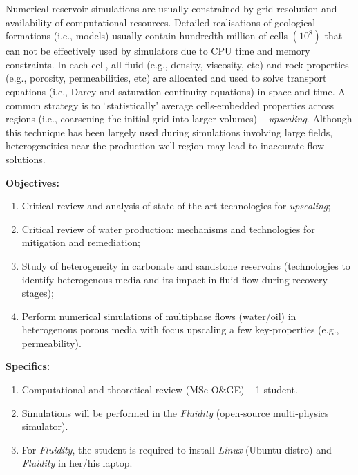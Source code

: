 \documentclass[12pts,a4paper,amsmath,amssymb,floatfix]{article}%
\newcommand{\MSc}{MSc O$\&$GE}
\begin{document}
\begin{enumerate}[label=\bfseries Project: \arabic*:]
Numerical reservoir simulations are usually constrained by grid resolution and availability of computational resources. Detailed realisations of geological formations (i.e., models) usually contain hundredth million of cells $\left(\text{10}^{8}\right)$ that can not be effectively used by simulators due to CPU time and memory constraints.  In each cell, all fluid (e.g., density, viscosity, etc) and rock properties (e.g., porosity, permeabilities, etc) are allocated and used to solve transport equations (i.e., Darcy and saturation continuity equations) in space and time. A common strategy is to $\lq$statistically' average cells-embedded properties across regions (i.e., coarsening the initial grid into larger volumes) -- {\it upscaling}.  Although this technique has been largely used during simulations involving large fields, heterogeneities near the production well region may lead to inaccurate flow solutions. 


\noindent
{\bf Objectives:}
\begin{enumerate}
\item Critical review and analysis of state-of-the-art technologies for {\it upscaling};
\item Critical review of water production: mechanisms and technologies for mitigation and remediation;
\item Study of heterogeneity in carbonate and sandstone reservoirs (technologies to identify heterogenous media and its impact in fluid flow during recovery stages);
\item Perform numerical simulations of multiphase flows (water/oil) in heterogenous porous media with focus upscaling a few key-properties (e.g., permeability).  
\end{enumerate}

\noindent
{\bf Specifics:} 
\begin{enumerate}
\item Computational and theoretical review (\MSc) -- 1 student. 
\item Simulations will be performed in the {\it Fluidity} (open-source multi-physics simulator). 
\item For {\it Fluidity}, the student is required to install {\it Linux} (Ubuntu distro) and {\it Fluidity} in her/his laptop. 
\end{enumerate}



\end{enumerate}
\end{document}
